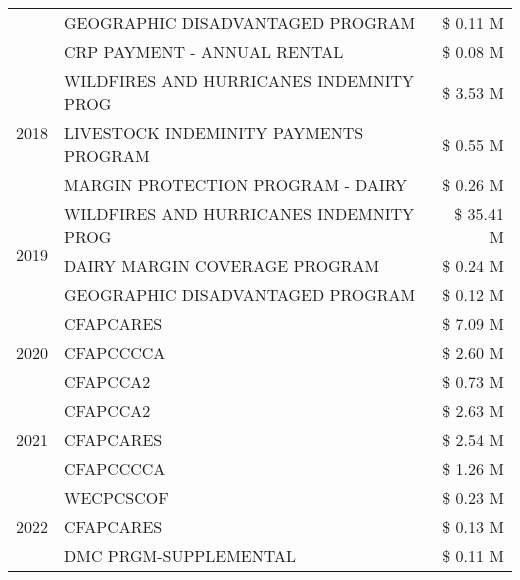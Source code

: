 \begin{tabular}{llr}
 & GEOGRAPHIC DISADVANTAGED PROGRAM & \$ 0.11 M \\
 & CRP PAYMENT - ANNUAL RENTAL & \$ 0.08 M \\
\cline{1-3}
\multirow[t]{3}{*}{2018} & WILDFIRES AND HURRICANES INDEMNITY PROG & \$ 3.53 M \\
 & LIVESTOCK INDEMINITY PAYMENTS PROGRAM & \$ 0.55 M \\
 & MARGIN PROTECTION PROGRAM - DAIRY & \$ 0.26 M \\
\cline{1-3}
\multirow[t]{3}{*}{2019} & WILDFIRES AND HURRICANES INDEMNITY PROG & \$ 35.41 M \\
 & DAIRY MARGIN COVERAGE PROGRAM & \$ 0.24 M \\
 & GEOGRAPHIC DISADVANTAGED PROGRAM & \$ 0.12 M \\
\cline{1-3}
\multirow[t]{3}{*}{2020} & CFAPCARES & \$ 7.09 M \\
 & CFAPCCCCA & \$ 2.60 M \\
 & CFAPCCA2 & \$ 0.73 M \\
\cline{1-3}
\multirow[t]{3}{*}{2021} & CFAPCCA2 & \$ 2.63 M \\
 & CFAPCARES & \$ 2.54 M \\
 & CFAPCCCCA & \$ 1.26 M \\
\cline{1-3}
\multirow[t]{3}{*}{2022} & WECPCSCOF & \$ 0.23 M \\
 & CFAPCARES & \$ 0.13 M \\
 & DMC PRGM-SUPPLEMENTAL & \$ 0.11 M \\
\cline{1-3}
\bottomrule
\end{tabular}
